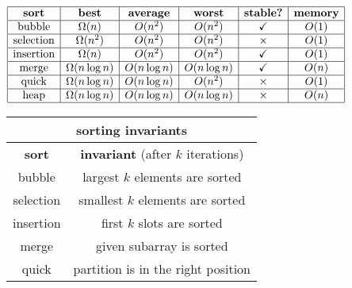 \documentclass[10pt, landscape]{article}
\newenvironment{tightcenter}{%
  \setlength\topsep{0pt}
  \setlength\parskip{0pt}
  \begin{center}
}{%
  \end{center}
}
\begin{document}
\begin{minipage}{0.5\linewidth}   
    \begin{tightcenter}
        $\begin{array}{| c | c | c | c | c | c |}
            \hline\textbf{sort} & \textbf{best} & \textbf{average} & \textbf{worst} & \textbf{stable?} & \textbf{memory}
    
            \\\hline\text{bubble} & \Omega(n) & O(n^2) & O(n^2) & \checkmark & O(1)
            
            \\\hline\text{selection} & \Omega(n^2) & O(n^2) & O(n^2) & \times & O(1)
            
            \\\hline\text{insertion} & \Omega(n) & O(n^2) & O(n^2) & \checkmark & O(1)
            
            \\\hline\text{merge} & \Omega(n\log n) & O(n\log n) & O(n\log n) & \checkmark & O(n)
            
            \\\hline\text{quick} & \Omega(n\log n) & O(n\log n) & O(n^2) & \times & O(1)
            \\\hline\text{heap} & \Omega(n\log n) & O(n\log n) & O(n\log n) & \times & O(n)
            \\\hline
        \end{array} 
        $\
        \begin{tabular}{| c | c |}
            \multicolumn{2}{c}{sorting invariants}
            \\\hline\textbf{sort} & \textbf{invariant} (after $k$ iterations)
            \\\hline bubble & largest $k$ elements are sorted
            \\\hline selection & smallest $k$ elements are sorted
            \\\hline insertion & first $k$ slots are sorted
            \\\hline merge & given subarray is sorted
            \\\hline quick & partition is in the right position
            \\\hline
        \end{tabular} 
    \end{tightcenter}
\end{minipage}
\end{document}
